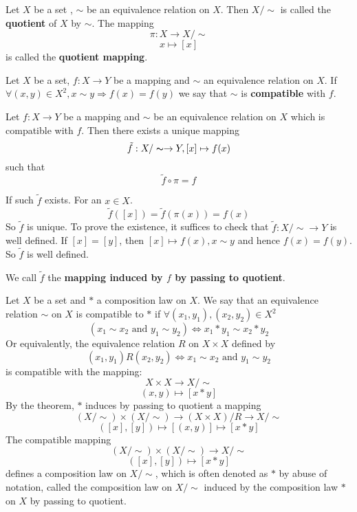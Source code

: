 \documentclass{book}
\numberwithin{equation}{section}
\begin{document}
\begin{notationenv}
    Let $X$ be a set , $\sim $ be an equivalence relation on $X$. Then $X/\sim$ is called the \textbf{quotient} of $X$ by $\sim$. The mapping 
    $$\pi:X\longrightarrow X/\sim $$
    $$x\longmapsto [x]$$
is called the \textbf{quotient mapping}.
\end{notationenv}
\begin{definitionenv}
    Let $X$ be a set, $f:X\rightarrow Y$ be a mapping and $\sim $ an equivalence relation on $X$. If $\forall(x,y)\in X^2, x\sim y\Rightarrow f(x)=f(y)$ we say that $\sim$ is \textbf{compatible} with $f$.
\end{definitionenv}
\begin{theoremenv}\label{5.5.5}
    Let $f:X\rightarrow Y$ be a mapping and $\sim $ be an equivalence relation on $X$ which is compatible with $f$. Then there exists a unique mapping 
    $$\tilde{f}:X/\thicksim\rightarrow Y, [x]\mapsto f(x)$$such that $$\tilde{f}\circ \pi =f$$
    \begin{center}
\end{center}
\end{theoremenv}
\begin{proofenv}
    If such $\tilde{f}$ exists. For an $x\in X$. 
    $$\tilde{f}([x])=\tilde{f}(\pi(x))=f(x)$$
    So $\tilde{f}$ is unique. To prove the existence, it suffices to check that $\tilde{f}:X/\sim\rightarrow Y$ is well defined. If $[x]=[y]$, then $[x]\mapsto f(x), x\sim y$ and hence $f(x)=f(y)$. So $\tilde{f}$ is well defined.
\end{proofenv}
\begin{definitionenv}
    We call $\tilde{f}$ the \textbf{mapping induced by $f$ by passing to quotient}.
\end{definitionenv}
\begin{exampleenv}
    Let $X$ be a set and $*$ a composition law on $X$. We say that an equivalence relation $\sim$ on $X$ is compatible to $*$ if $\forall (x_1,y_1),(x_2,y_2)\in X^2$
    $$(x_1\sim x_2 \text{ and } y_1\sim y_2)\Leftrightarrow x_1*y_1\sim x_2*y_2$$
    Or equivalently, the equivalence relation $R$ on $X\times X$ defined by 
    $$(x_1,y_1)R(x_2,y_2)\Leftrightarrow x_1\sim x_2\text{ and }y_1\sim y_2$$
    is compatible with the mapping:
    $$X\times X\longrightarrow X/\sim$$
    $$(x,y)\longmapsto [x*y]$$
    By the theorem, $*$ induces by passing to quotient a mapping
    $$(X/\sim)\times (X/\sim) \longrightarrow (X\times X)/R\longrightarrow X/\sim$$
    $$([x],[y])\longmapsto[(x,y)]\longmapsto[x*y]$$
    The compatible mapping
    $$(X/\sim)\times (X/\sim) \longrightarrow X/\sim$$
    $$([x],[y])\longmapsto[x*y]$$
    defines a composition law on $X/\sim$, which is often denoted as $*$ by abuse of notation, called the composition law on $X/\sim$ induced by the composition law $*$ on $X$ by passing to quotient.
\end{exampleenv}
\end{document}
